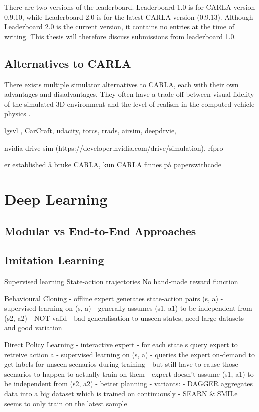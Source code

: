 There are two versions of the leaderboard. Leaderboard 1.0 is for CARLA version 0.9.10, while Leaderboard 2.0 is for the latest CARLA version (0.9.13). Although Leaderboard 2.0 is the current version, it contains no entries at the time of writing. This thesis will therefore discuss submissions from leaderboard 1.0.


\subsection{Alternatives to CARLA}
There exists multiple simulator alternatives to CARLA, each with their own advantages and disadvantages. They often have a trade-off between visual fidelity of the simulated 3D environment and the level of realism in the computed vehicle physics \cite{carla-an-inside-out}.

lgsvl \cite{LGSVL-simulator}, CarCraft, udacity, torcs, rrads, airsim, deepdrvie,


nvidia drive sim (https://developer.nvidia.com/drive/simulation), rfpro


er established å bruke CARLA, kun CARLA finnes på paperswithcode

\section{Deep Learning}

\subsection{Modular vs End-to-End Approaches}

\subsection{Imitation Learning}

Supervised learning
State-action trajectories
No hand-made reward function

Behavioural Cloning
- offline expert generates state-action pairs (s, a)
- supervised learning on (s, a)
- generally assumes (s1, a1) to be independent from (s2, a2) - NOT valid
    - bad generalisation to unseen states, need large datasets and good variation

Direct Policy Learning
- interactive expert
- for each state s query expert to retreive action a
  - supervised learning on (s, a)
- queries the expert on-demand to get labels for unseen scenarios during training
    - but still have to cause those scenarios to happen to actually train on them
- expert doesn't assume (s1, a1) to be independent from (s2, a2) - better planning
- variants:
    - DAGGER aggregates data into a big dataset which is trained on continuously
    - SEARN \& SMILe seems to only train on the latest sample


